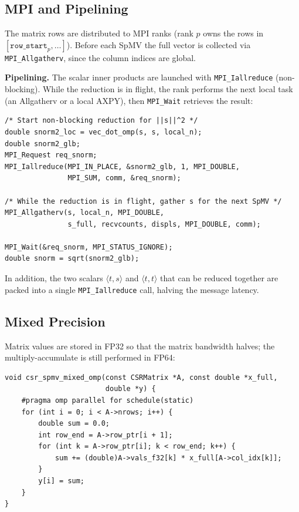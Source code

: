\documentclass[11pt,a4paper]{article}
\begin{document}
\subsection{MPI and Pipelining}

The matrix rows are distributed to MPI ranks (rank $p$ owns the rows
in $[\texttt{row\_start}_p, \ldots]$). Before each SpMV the full
vector is collected via \texttt{MPI\_Allgatherv}, since the column
indices are global.

\textbf{Pipelining.} The scalar inner products are launched with
\texttt{MPI\_Iallreduce} (non-blocking). While the reduction is in
flight, the rank performs the next local task (an Allgatherv or a
local AXPY), then \texttt{MPI\_Wait} retrieves the result:

\begin{lstlisting}[caption={Pipelined reduction in the MPI version.}]
/* Start non-blocking reduction for ||s||^2 */
double snorm2_loc = vec_dot_omp(s, s, local_n);
double snorm2_glb;
MPI_Request req_snorm;
MPI_Iallreduce(MPI_IN_PLACE, &snorm2_glb, 1, MPI_DOUBLE,
               MPI_SUM, comm, &req_snorm);

/* While the reduction is in flight, gather s for the next SpMV */
MPI_Allgatherv(s, local_n, MPI_DOUBLE,
               s_full, recvcounts, displs, MPI_DOUBLE, comm);

MPI_Wait(&req_snorm, MPI_STATUS_IGNORE);
double snorm = sqrt(snorm2_glb);
\end{lstlisting}

In addition, the two scalars $\langle t,s \rangle$ and
$\langle t,t \rangle$ that can be reduced together are packed into a
single \texttt{MPI\_Iallreduce} call, halving the message latency.

\subsection{Mixed Precision}

Matrix values are stored in FP32 so that the matrix bandwidth halves;
the multiply-accumulate is still performed in FP64:

\begin{lstlisting}[caption={Mixed-precision SpMV.}]
void csr_spmv_mixed_omp(const CSRMatrix *A, const double *x_full,
                        double *y) {
    #pragma omp parallel for schedule(static)
    for (int i = 0; i < A->nrows; i++) {
        double sum = 0.0;
        int row_end = A->row_ptr[i + 1];
        for (int k = A->row_ptr[i]; k < row_end; k++) {
            sum += (double)A->vals_f32[k] * x_full[A->col_idx[k]];
        }
        y[i] = sum;
    }
}
\end{lstlisting}
\end{document}
